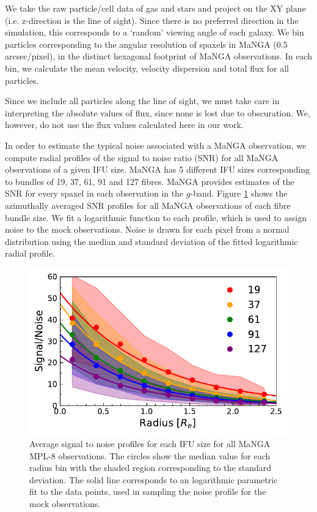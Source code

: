 We take the raw particle/cell data of gas and stars and project on the XY plane (i.e. z-direction is the line of sight). Since there is no preferred direction in the simulation, this corresponds to a `random' viewing angle of each galaxy. We bin particles corresponding to the angular resolution of spaxels in MaNGA (0.5 arcsec/pixel), in the distinct hexagonal footprint of MaNGA observations. In each bin, we calculate the mean velocity, velocity dispersion and total flux for all particles. 

Since we include all particles along the line of sight, we must take care in interpreting the absolute values of flux, since none is lost due to obscuration. We, however, do not use the flux values calculated here in our work.

In order to estimate the typical noise associated with a MaNGA observation, we compute radial profiles of the signal to noise ratio (SNR) for all MaNGA observations of a given IFU size. MaNGA has 5 different IFU sizes corresponding to bundles of 19, 37, 61, 91 and 127 fibres. MaNGA provides estimates of the SNR for every spaxel in each observation in the $g$-band. Figure \ref{fig:noise_profile} shows the azimuthally averaged SNR profiles for all MaNGA observations of each fibre bundle size. We fit a logarithmic function to each profile, which is used to assign noise to the mock observations. Noise is drawn for each pixel from a normal distribution using the median and standard deviation of the fitted logarithmic radial profile.

\begin{figure}
    \centering
	\includegraphics[width=0.95\linewidth]{misalignment_TNG/noise_profiles_ifusize.pdf}
    \caption{Average signal to noise profiles for each IFU size for all MaNGA MPL-8 observations. The circles show the median value for each radius bin with the shaded region corresponding to the standard deviation. The solid line corresponds to an logarithmic parametric fit to the data points, used in sampling the noise profile for the mock observations.}
    \label{fig:noise_profile}
\end{figure}

